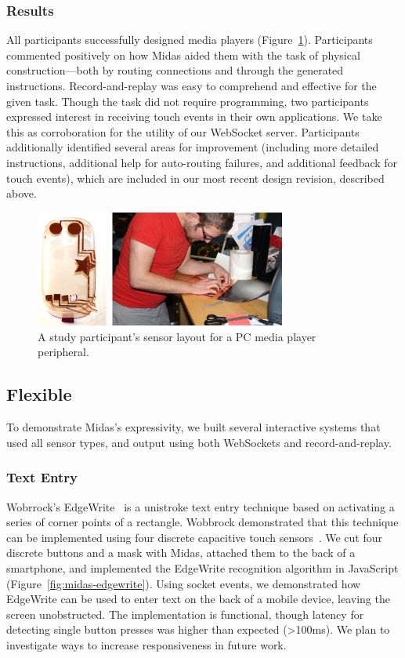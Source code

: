     \subsubsection{Results}
All participants successfully designed media players (Figure~\ref{fig:midas-study1}). Participants commented positively on how Midas aided them with the task of physical construction---both by routing connections and through the generated instructions. Record-and-replay was easy to comprehend and effective for the given task. Though the task did not require programming, two participants expressed interest in receiving touch events in their own applications. We take this as corroboration for the utility of our WebSocket server. Participants additionally identified several areas for improvement (including more detailed instructions, additional help for auto-routing failures, and additional feedback for touch events), which are included in our most recent design revision, described above.

\begin{figure}[t]
\centering
\includegraphics[width=3.25in]{figures/midas/study1.jpg}
\caption{A study participant's sensor layout for a PC media player peripheral.} 
\label{fig:midas-study1}
\end{figure}

    \subsection{Flexible}
    
    To demonstrate Midas's expressivity, we built several interactive systems that used all sensor types, and output using both WebSockets and record-and-replay.
    
        \subsubsection{Text Entry}
Wobrrock's EdgeWrite~\cite{wobbrock-edgewrite} is a unistroke text entry technique based on activating a series of corner points of a rectangle. Wobbrock demonstrated that this technique can be implemented using four discrete capacitive touch sensors~\cite{edgewrite-cap}. We cut four discrete buttons and a mask with Midas, attached them to the back of a smartphone, and implemented the EdgeWrite recognition algorithm in JavaScript (Figure~\ref{fig:midas-edgewrite}). Using socket events, we demonstrated how EdgeWrite can be used to enter text on the back of a mobile device, leaving the screen unobstructed. The implementation is functional, though latency for detecting single button presses was higher than expected (\textgreater 100ms). We plan to investigate ways to increase responsiveness in future work.

